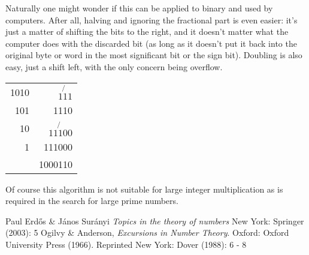\documentclass[12pt]{article}
\begin{document}
Naturally one might wonder if this can be applied to binary and used by computers. After all, halving and ignoring the fractional part is even easier: it's just a matter of shifting the bits to the right, and it doesn't matter what the computer does with the discarded bit (as long as it doesn't put it back into the original byte or word in the most significant bit or the sign bit). Doubling is also easy, just a shift left, with the only concern being overflow.

\begin{tabular}{|r|r|}
1010 & $\not{111}$ \\
101 & 1110 \\
10 & $\not{11100}$ \\
1 & 111000 \\
 & 1000110 \\
\end{tabular}

Of course this algorithm is not suitable for large integer multiplication as is required in the search for large prime numbers.

\begin{thebibliography}{1}
 Paul Erd\H{o}s \& J\'anos Sur\'anyi {\it Topics in the theory of numbers} New York: Springer (2003): 5
 Ogilvy \& Anderson, {\it Excursions in Number Theory}. Oxford: Oxford University Press (1966). Reprinted New York: Dover (1988): 6 - 8
\end{thebibliography}
\end{document}
